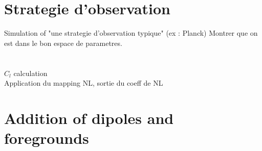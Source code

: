 \documentclass[english,11pt]{report}
\begin{document}
\section{Strategie d'observation}
Simulation of "une strategie d'observation typique" (ex : Planck)
Montrer que on est dans le bon espace de parametres.

\section{}
$C_{l}$ calculation\\
Application du mapping NL, sortie du coeff de NL


\section{Addition of dipoles and foregrounds }




%


%





\end{document}
